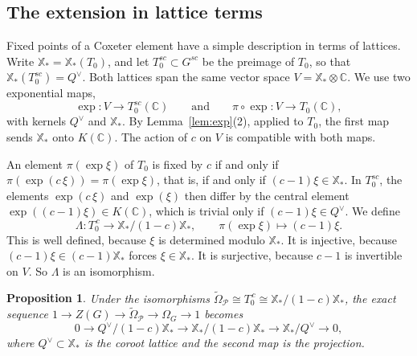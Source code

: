 \documentclass[psamsfonts]{amsart}
\newtheorem{prop}[thm]{Proposition}
\theoremstyle{definition}
\theoremstyle{remark}
\numberwithin{equation}{section}
\newcommand{\X}{\mathbb{X}}
\newcommand{\ra}{\rightarrow}
\newcommand{\tOm}{\widetilde{\Omega}}
\newcommand\cP{\mathcal{P}}
\newcommand{\CC}{\mathbb{C}}
\numberwithin{equation}{section}
\newcommand{\Om}{\Omega}
\theoremstyle{plain}
\begin{document}
\subsection{The extension in lattice terms}
Fixed points of a Coxeter element have a simple description in terms of lattices. Write $\X_*=\X_*(T_0)$, and let $T_0^{sc}\subset G^{sc}$ be the preimage of $T_0$, so that $\X_*(T_0^{sc})=Q^\vee$. Both lattices span the same vector space $V=\X_*\otimes\CC$. We use two exponential maps,
\[
\exp\colon V\ra T_0^{sc}(\CC)\qquad\text{and}\qquad \pi\circ\exp\colon V\ra T_0(\CC),
\]
with kernels $Q^\vee$ and $\X_*$. By Lemma~\ref{lem:exp}(2), applied to $T_0$, the first map sends $\X_*$ onto $K(\CC)$. The action of $c$ on $V$ is compatible with both maps.

An element $\pi(\exp\xi)$ of $T_0$ is fixed by $c$ if and only if $\pi(\exp(c\,\xi))=\pi(\exp\xi)$, that is, if and only if $(c-1)\xi\in\X_*$. In $T_0^{sc}$, the elements $\exp(c\,\xi)$ and $\exp(\xi)$ then differ by the central element $\exp((c-1)\xi)\in K(\CC)$, which is trivial only if $(c-1)\xi\in Q^\vee$. We define
\[
\Lambda\colon T_0^{\,c}\ra\X_*/(1-c)\X_*,\qquad \pi(\exp\xi)\mapsto(c-1)\xi.
\]
This is well defined, because $\xi$ is determined modulo $\X_*$. It is injective, because $(c-1)\xi\in(c-1)\X_*$ forces $\xi\in\X_*$. It is surjective, because $c-1$ is invertible on $V$. So $\Lambda$ is an isomorphism.

\begin{prop}\label{prop:lattice}
Under the isomorphisms $\tOm_\cP\cong T_0^{\,c}\cong\X_*/(1-c)\X_*$, the exact sequence $1\ra Z(G)\ra \tOm_\cP\ra\Om_G\ra1$ becomes
\[
0\ra Q^\vee/(1-c)\X_*\ra\X_*/(1-c)\X_*\ra\X_*/Q^\vee\ra0,
\]
where $Q^\vee\subset\X_*$ is the coroot lattice and the second map is the projection.
\end{prop}
\end{document}
